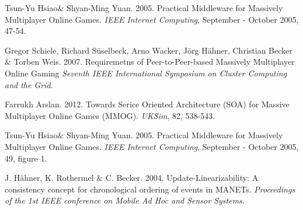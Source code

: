 \begin{thebibliography}{9}

	Tsun-Yu Hsiao$\&$ Shyan-Ming Yuan.
	2005.	
 	Practical Middleware for Massively Multiplayer Online Games.
	\emph{IEEE Internet Computing},
	September - October 2005, 47-54.

	Gregor Schiele, Richard S\"{u}selbeck, Arno Wacker, J\"{o}rg H\"{a}hner, Christian Becker $\&$ Torben Weis.
	2007.	
 	Requiremetns of Peer-to-Peer-based Massively Multiplayer Online Gaming
	\emph{Seventh IEEE International Symposium on Cluster Computing and the Grid}.

	Farrukh Arslan.
	2012.	
 	Towards Serice Oriented Architecture (SOA) for Massive Multiplayer Online Games (MMOG).
	\emph{UKSim},
	82, 538-543.

	Tsun-Yu Hsiao$\&$ Shyan-Ming Yuan.
	2005.	
 	Practical Middleware for Massively Multiplayer Online Games.
	\emph{IEEE Internet Computing},
	September - October 2005, 49, figure 1.

	J. H\"{a}hner, K. Rothermel $\&$ C. Becker.
	2004.	
 	Update-Linearizability: A consistency concept for chronological ordering of events in MANETs. 
	\emph{Proceedings of the 1st IEEE conference on Mobile Ad Hoc and Sensor Systems}.
\end{thebibliography}
